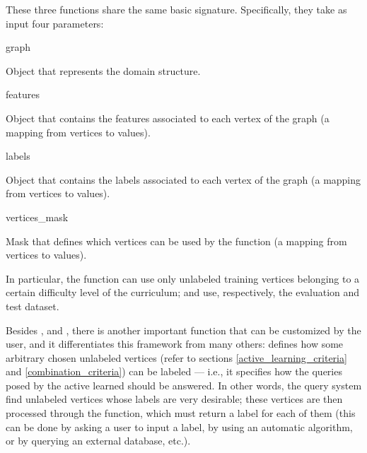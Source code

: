             These three functions share the same basic signature. Specifically, they take as input four parameters:
            \begin{parameters}
                \item[graph] 
                
                Object that represents the domain structure.
                \item[features] 
                
                Object that contains the features associated to each vertex of the graph (a mapping from vertices to  values).
                \item[labels] 
                
                Object that contains the labels associated to each vertex of the graph (a mapping from vertices to  values).
                \item[vertices\_mask] 
                
                Mask that defines which vertices can be used by the function (a mapping from vertices to  values).
            \end{parameters}
            In particular, the  function can use only unlabeled training vertices belonging to a certain difficulty level of the curriculum;  and  use, respectively, the evaluation and test dataset.
            
            Besides ,  and , there is another important function that can be customized by the user, and it differentiates this framework from many others:  defines how some arbitrary chosen unlabeled vertices (refer to sections \ref{active_learning_criteria} and \ref{combination_criteria}) can be labeled --- i.e., it specifies how the queries posed by the active learned should be answered. In other words, the query system find unlabeled vertices whose labels are very desirable; these vertices are then processed through the  function, which must return a label for each of them (this can be done by asking a user to input a label, by using an automatic algorithm, or by querying an external database, etc.).
            
